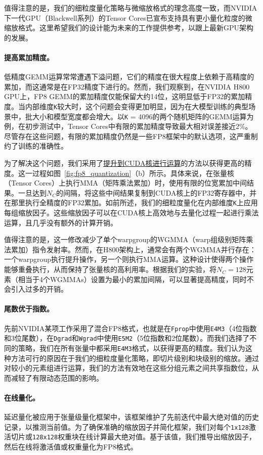 \documentclass[lang=cn,a4paper,newtx]{elegantpaper}
\begin{document}
值得注意的是，我们的细粒度量化策略与微缩放格式的理念高度一致，而NVIDIA下一代GPU（Blackwell系列）的Tensor Cores已宣布支持具有更小量化粒度的微缩放格式。这里希望我们的设计能为未来的工作提供参考，以跟上最新GPU架构的发展。

\paragraph{提高累加精度。}
低精度GEMM运算常常遭遇下溢问题，它们的精度在很大程度上依赖于高精度的累加，而这通常是在FP32精度下进行的。然而，我们观察到，在NVIDIA H800 GPU上，FP8 GEMM的累加精度仅能保留大约14位，这明显低于FP32的累加精度。当内部维度\texttt{K}较大时，这个问题会变得更加明显，因为在大模型训练的典型场景中，批大小和模型宽度都会增大。以\texttt{K} = 4096的两个随机矩阵的GEMM运算为例，在初步测试中，Tensor Cores中有限的累加精度导致最大相对误差接近2\%。尽管存在这些问题，有限的累加精度仍然是一些FP8框架中的默认选项，这严重制约了训练的准确性。

为了解决这个问题，我们采用了\underline{提升到CUDA核进行运算}的方法以获得更高的精度。这一过程如图~\ref{fig:fp8_quantization}（b）所示。具体来说，在张量核（Tensor Cores）上执行MMA（矩阵乘法累加）时，使用有限的位宽累加中间结果。一旦达到$N_C$的间隔，将这些中间结果复制到CUDA核上的FP32寄存器中，并在那里执行全精度的FP32累加。如前所述，我们的细粒度量化在内部维度\texttt{K}上应用每组缩放因子。这些缩放因子可以在CUDA核上高效地与去量化过程一起进行乘法运算，且几乎没有额外的计算开销。

值得注意的是，这一修改减少了单个warpgroup的WGMMA（warp组级别矩阵乘法累加）指令发射率。然而，在H800架构上，通常会有两个WGMMA并行存在：一个warpgroup执行提升操作，另一个则执行MMA运算。这种设计使得两个操作能够重叠执行，从而保持了张量核的高利用率。根据我们的实验，将$N_C=128$元素（相当于4个WGMMAs）设置为最小的累加间隔，可以显著提高精度，同时不会引入过多的开销。

\paragraph{尾数优于指数。}
先前NVIDIA某项工作采用了混合FP8格式，也就是在\texttt{Fprop}中使用\texttt{E4M3}（4位指数和3位尾数），在\texttt{Dgrad}和\texttt{Wgrad}中使用\texttt{E5M2}（5位指数和2位尾数）。而我们选择了不同的策略，我们在所有张量中都采用\texttt{E4M3}格式，以获得更高的精度。我们认为这种方法可行的原因在于我们的细粒度量化策略，即切片级别和块级别的缩放。通过对较小的元素组进行运算，我们的方法有效地在这些分组元素之间共享指数位，从而减轻了有限动态范围的影响。

\paragraph{在线量化。}
延迟量化被应用于张量级量化框架中，该框架维护了先前迭代中最大绝对值的历史记录，以推测当前值。为了确保准确的缩放因子并简化框架，我们对每个\texttt{1x128}激活切片或\texttt{128x128}权重块在线计算最大绝对值。基于该值，我们推导出缩放因子，然后在线将激活值或权重量化为FP8格式。
\end{document}

